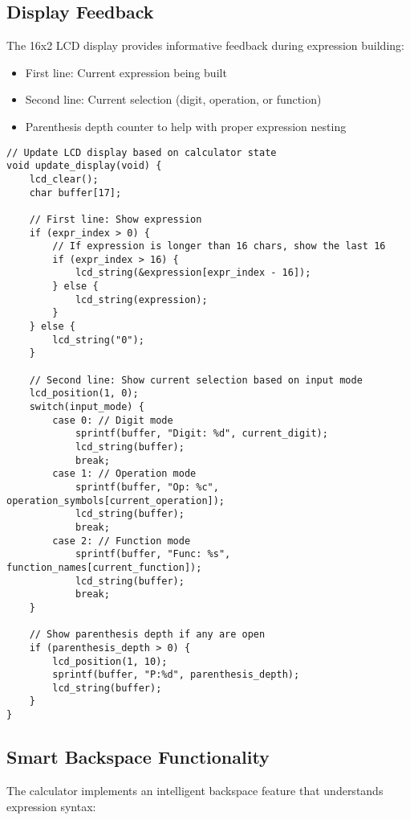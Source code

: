 \documentclass[12pt,a4paper]{article}
\begin{document}
\subsection{Display Feedback}

The 16x2 LCD display provides informative feedback during expression building:

\begin{itemize}
    \item First line: Current expression being built
    \item Second line: Current selection (digit, operation, or function)
    \item Parenthesis depth counter to help with proper expression nesting
\end{itemize}

\begin{lstlisting}
// Update LCD display based on calculator state
void update_display(void) {
    lcd_clear();
    char buffer[17];
    
    // First line: Show expression
    if (expr_index > 0) {
        // If expression is longer than 16 chars, show the last 16
        if (expr_index > 16) {
            lcd_string(&expression[expr_index - 16]);
        } else {
            lcd_string(expression);
        }
    } else {
        lcd_string("0");
    }
    
    // Second line: Show current selection based on input mode
    lcd_position(1, 0);
    switch(input_mode) {
        case 0: // Digit mode
            sprintf(buffer, "Digit: %d", current_digit);
            lcd_string(buffer);
            break;
        case 1: // Operation mode
            sprintf(buffer, "Op: %c", operation_symbols[current_operation]);
            lcd_string(buffer);
            break;
        case 2: // Function mode
            sprintf(buffer, "Func: %s", function_names[current_function]);
            lcd_string(buffer);
            break;
    }
    
    // Show parenthesis depth if any are open
    if (parenthesis_depth > 0) {
        lcd_position(1, 10);
        sprintf(buffer, "P:%d", parenthesis_depth);
        lcd_string(buffer);
    }
}
\end{lstlisting}

\subsection{Smart Backspace Functionality}

The calculator implements an intelligent backspace feature that understands expression syntax:
\end{document}
